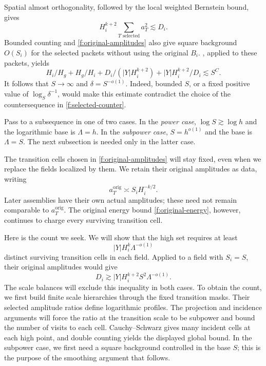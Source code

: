 Spatial almost orthogonality, followed by the local weighted Bernstein
bound, gives
\begin{equation}\label{f:original-energy}
 H_i^{k+2}\sum_{T\text{ selected}}a_T^2\lesssim D_i.
\end{equation}
Bounded counting and \eqref{f:original-amplitudes} also give square
background $O(S_i)$ for the selected packets without using the original
$B_i$. , applied to these packets, yields
\begin{equation}\label{f:Sbalance}
 H_i/H_g+H_g/H_i+D_i/(|Y|H_i^{k+2})
       +|Y|H_i^{k+2}/D_i\lesssim S^C.
\end{equation}
It follows that $S\to\infty$ and $\delta=S^{-o(1)}$. Indeed, bounded
$S$, or a fixed positive value of $\log_S\delta^{-1}$, would make this
estimate contradict the choice of the countersequence in
\eqref{f:selected-counter}.

Pass to a subsequence in one of two cases. In the \emph{power case},
$\log S\gtrsim\log h$ and the logarithmic base is $\Lambda=h$. In the
\emph{subpower case}, $S=h^{o(1)}$ and the base is $\Lambda=S$. The next
subsection is needed only in the latter case.

The transition cells chosen in \eqref{f:original-amplitudes} will stay
fixed, even when we replace the fields localized by them.  We retain
their original amplitudes as data, writing
\[
 a_T^{\mathrm{orig}}\asymp S_iH_i^{-k/2}.
\]
Later assemblies have their own actual amplitudes; these need not remain
comparable to $a_T^{\mathrm{orig}}$.  The original energy bound
\eqref{f:original-energy}, however, continues to charge every surviving
transition cell.

Here is the count we seek.  We will show that the high set requires at
least
\[
 |Y|H_i^k\Lambda^{-o(1)}
\]
distinct surviving transition cells in each field.  Applied to a field
with $S_i=S$, their original amplitudes would give
\[
 D_i\gtrsim |Y|H_i^{k+2}S^2\Lambda^{-o(1)}.
\]
The scale balances will exclude this inequality in both cases.  To
obtain the count, we first build finite scale hierarchies through the
fixed transition masks.  Their selected amplitude ratios define
logarithmic profiles.  The projection and incidence arguments will
force the ratio at the transition scale to be subpower and bound the
number of visits to each cell.  Cauchy--Schwarz gives many incident cells at each high point, and
double counting yields the displayed global bound.  In the subpower case,
we first need a square background controlled in the base $S$; this is
the purpose of the smoothing argument that follows.

